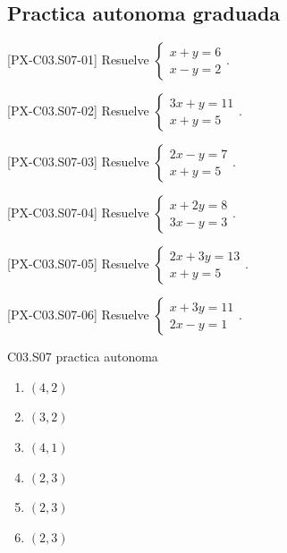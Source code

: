 \subsection*{Practica autonoma graduada}
\begin{exercise}{[PX-C03.S07-01] Resuelve \(\begin{cases}x+y=6\\ x-y=2\end{cases}\).}
\end{exercise}
\begin{exercise}{[PX-C03.S07-02] Resuelve \(\begin{cases}3x+y=11\\ x+y=5\end{cases}\).}
\end{exercise}
\begin{exercise}{[PX-C03.S07-03] Resuelve \(\begin{cases}2x-y=7\\ x+y=5\end{cases}\).}
\end{exercise}
\begin{exercise}{[PX-C03.S07-04] Resuelve \(\begin{cases}x+2y=8\\ 3x-y=3\end{cases}\).}
\end{exercise}
\begin{exercise}{[PX-C03.S07-05] Resuelve \(\begin{cases}2x+3y=13\\ x+y=5\end{cases}\).}
\end{exercise}
\begin{exercise}{[PX-C03.S07-06] Resuelve \(\begin{cases}x+3y=11\\ 2x-y=1\end{cases}\).}
\end{exercise}

\begin{shortanswer}{C03.S07 practica autonoma}
\begin{enumerate}[label=\textbf{PX-C03.S07-\arabic*:}, leftmargin=*]
  \item \((4,2)\)
  \item \((3,2)\)
  \item \((4,1)\)
  \item \((2,3)\)
  \item \((2,3)\)
  \item \((2,3)\)
\end{enumerate}
\end{shortanswer}

